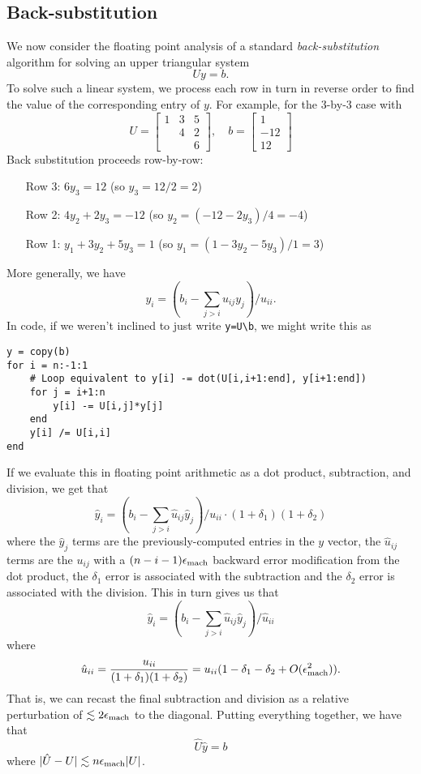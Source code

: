 \documentclass[12pt, leqno]{article} %
\begin{document}
\subsection{Back-substitution}

We now consider the floating point analysis of a standard
{\em back-substitution} algorithm for solving an upper triangular
system
\[
  Uy = b.
\]
To solve such a linear system, we process each row in turn in reverse
order to find the value of the corresponding entry of $y$.  For
example, for the 3-by-3 case with
\[
U = \begin{bmatrix} 1 & 3 & 5 \\ & 4 & 2 \\ & & 6 \end{bmatrix}, \quad
b = \begin{bmatrix} 1 \\ -12 \\ 12 \end{bmatrix}
\]
Back substitution proceeds row-by-row:
\begin{itemize}
\item[Row 3:] $6 y_3 = 12$ (so $y_3 = 12/2 = 2$)
\item[Row 2:] $4 y_2 + 2 y_3 = -12$ (so $y_2 = (-12-2y_3)/4 = -4$)
\item[Row 1:] $y_1 + 3 y_2 + 5 y_3 = 1$ (so $y_1 = (1-3y_2-5y_3)/1 = 3$)
\end{itemize}
More generally, we have
\[
  y_i = \left( b_i - \sum_{j > i} u_{ij} y_j \right)/u_{ii}.
\]
In code, if we weren't inclined to just write \verb|y=U\b|, we might
write this as
\begin{lstlisting}
y = copy(b)
for i = n:-1:1
    # Loop equivalent to y[i] -= dot(U[i,i+1:end], y[i+1:end])
    for j = i+1:n
        y[i] -= U[i,j]*y[j]
    end
    y[i] /= U[i,i]
end
\end{lstlisting}

If we evaluate this in floating point arithmetic as a dot product,
subtraction, and division, we get that
\[
  \hat{y}_i = \left( b_i - \sum_{j > i} \hat{u}_{ij} \hat{y}_j
  \right)/u_{ii} \cdot (1+\delta_1) (1+\delta_2)
\]
where the $\hat{y}_j$ terms are the previously-computed entries in the
$y$ vector, the $\hat{u}_{ij}$ terms are the $u_{ij}$ with a $(n-i-1)
\epsilon_{\mathrm{mach}}$ backward error modification from the dot product, the
$\delta_1$ error is associated with the subtraction and the $\delta_2$
error is associated with the division.  This in turn gives us that
\[
  \hat{y}_i = \left( b_i - \sum_{j > i} \hat{u}_{ij} \hat{y}_j \right)/\hat{u}_{ii}
\]
where
\[
  \hat{u}_{ii} = \frac{u_{ii}}{(1+\delta_1)(1+\delta_2)} =
  u_{ii} (1-\delta_1-\delta_2+ O(\epsilon_{\mathrm{mach}}^2)).
\]
That is, we can recast the final subtraction and division
as a relative perturbation of $\lesssim 2 \epsilon_{\mathrm{mach}}$ to the diagonal.
Putting everything together, we have that
\[
  \hat{U} \hat{y} = b
\]
where $|\hat{U}-U| \lesssim n \epsilon_{\mathrm{mach}} |U|$.
\end{document}
